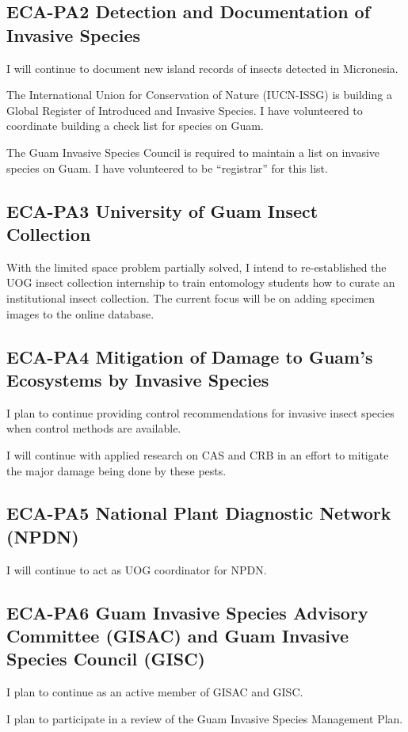 \subsection{ECA-PA2 Detection and Documentation of Invasive Species} 
I will continue to document new island records of insects detected in Micronesia.

The International Union for Conservation of Nature (IUCN-ISSG) is
building a Global Register of Introduced and Invasive Species. I have
volunteered to coordinate building a check list for species on Guam.

The Guam Invasive Species Council is required to maintain a list on
invasive species on Guam. I have volunteered to be ``registrar''
for this list.

\subsection{ECA-PA3 University of Guam Insect Collection}
With the limited space problem partially solved, I intend to re-established the UOG insect collection internship to train entomology students how to curate an institutional insect collection.
The current focus will be on adding specimen images to the online database.

\subsection{ECA-PA4 Mitigation of Damage to Guam's Ecosystems by Invasive Species} 
I plan to continue providing control recommendations for invasive insect species when control methods are available.

I will continue with applied research on CAS and CRB in an effort to mitigate the major damage being done by these pests.

\subsection{ECA-PA5 National Plant Diagnostic Network (NPDN)}
I will continue to act as UOG coordinator for NPDN.

\subsection{ECA-PA6 Guam Invasive Species Advisory Committee (GISAC) and Guam Invasive Species Council (GISC)}
I plan to continue as an active member of GISAC and GISC.

I plan to participate in a review of the Guam Invasive Species Management Plan.


